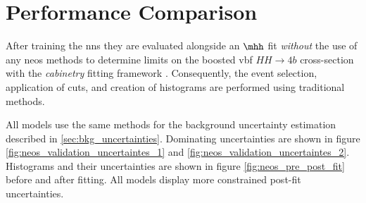 \section{Performance Comparison}
After training the \acp{nn} they are evaluated alongside an $\mhh$ fit \textit{without} the use of any \ac{neos} methods to determine limits on the boosted \ac{vbf} $HH\rightarrow4b$ cross-section with the \textit{cabinetry} fitting framework \citep{cranmer_2021_4627038}. Consequently, the event selection, application of cuts, and creation of histograms are performed using traditional methods.

All models use the same methods for the background uncertainty estimation described in \ref{sec:bkg_uncertainties}. Dominating uncertainties are shown in figure \ref{fig:neos_validation_uncertaintes_1} and \ref{fig:neos_validation_uncertaintes_2}. Histograms and their uncertainties are shown in figure \ref{fig:neos_pre_post_fit} before and after fitting. All models display more constrained post-fit uncertainties.

